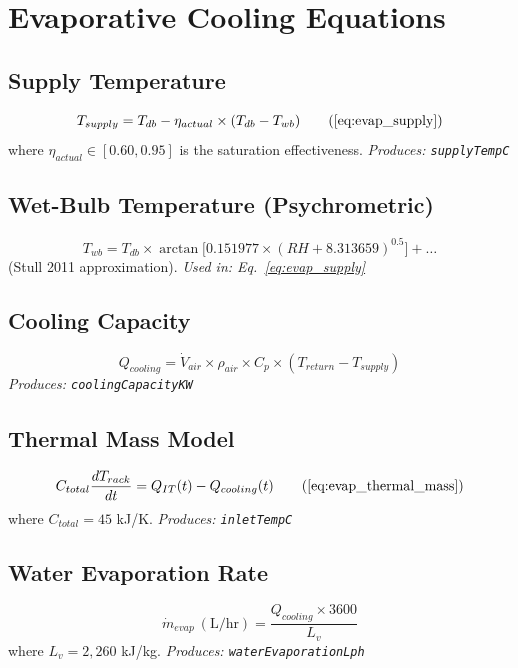 \documentclass[12pt,a4paper]{report}
\begin{document}
\section{Evaporative Cooling Equations}

\subsection{Supply Temperature}
\begin{equation}
T_{supply} = T_{db} - \eta_{actual} \times (T_{db} - T_{wb})
\tag{\ref{eq:evap_supply}}
\end{equation}
where $\eta_{actual} \in [0.60, 0.95]$ is the saturation effectiveness.
\textit{Produces: \texttt{supplyTempC}}

\subsection{Wet-Bulb Temperature (Psychrometric)}
\begin{equation}
T_{wb} = T_{db} \times \arctan\bigl[0.151977 \times (RH + 8.313659)^{0.5}\bigr] + \ldots
\label{eq:wetbulb}
\end{equation}
(Stull 2011 approximation). \textit{Used in: Eq.~\ref{eq:evap_supply}}

\subsection{Cooling Capacity}
\begin{equation}
Q_{cooling} = \dot{V}_{air} \times \rho_{air} \times C_p \times (T_{return} - T_{supply})
\label{eq:evap_capacity}
\end{equation}
\textit{Produces: \texttt{coolingCapacityKW}}

\subsection{Thermal Mass Model}
\begin{equation}
C_{total}\frac{dT_{rack}}{dt} = Q_{IT}(t) - Q_{cooling}(t)
\tag{\ref{eq:evap_thermal_mass}}
\end{equation}
where $C_{total} = 45$ kJ/K. \textit{Produces: \texttt{inletTempC}}

\subsection{Water Evaporation Rate}
\begin{equation}
\dot{m}_{evap}\ (\text{L/hr}) = \frac{Q_{cooling} \times 3600}{L_v}
\label{eq:evap_water}
\end{equation}
where $L_v = 2{,}260$ kJ/kg. \textit{Produces: \texttt{waterEvaporationLph}}
\end{document}
